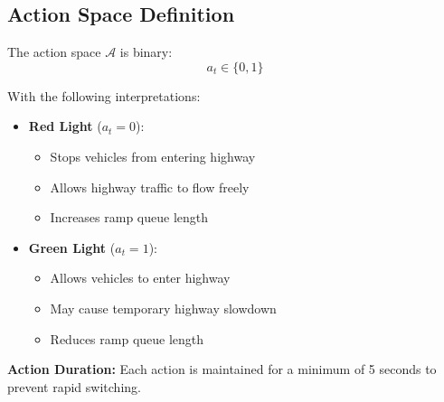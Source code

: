 \documentclass[a4paper, 12pt]{article}
\begin{document}
\subsection{Action Space Definition}
\begin{tcolorbox}[title=Control Actions]
The action space \( \mathcal{A} \) is binary:
\[
a_t \in \{0, 1\}
\]

With the following interpretations:
\begin{itemize}
    \item \textbf{Red Light} (\( a_t = 0 \)):
    \begin{itemize}
        \item Stops vehicles from entering highway
        \item Allows highway traffic to flow freely
        \item Increases ramp queue length
    \end{itemize}
    
    \item \textbf{Green Light} (\( a_t = 1 \)):
    \begin{itemize}
        \item Allows vehicles to enter highway
        \item May cause temporary highway slowdown
        \item Reduces ramp queue length
    \end{itemize}
\end{itemize}

\textbf{Action Duration:} Each action is maintained for a minimum of 5 seconds to prevent rapid switching.
\end{tcolorbox}
\end{document}
